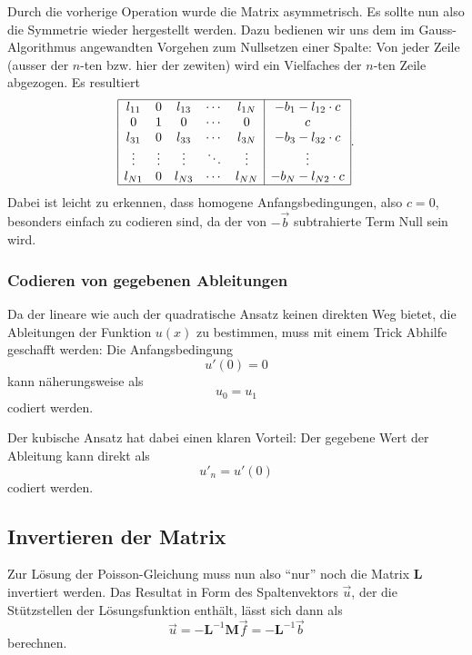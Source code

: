 Durch die vorherige Operation wurde die Matrix asymmetrisch. 
Es sollte nun also die Symmetrie wieder hergestellt werden.
Dazu bedienen wir uns dem im Gauss-Algorithmus angewandten Vorgehen zum Nullsetzen einer Spalte: Von jeder Zeile (ausser der $n$-ten bzw. hier der zewiten) wird ein Vielfaches der $n$-ten Zeile abgezogen.
Es resultiert
\begin{equation*}
        \begin{array}{|ccccc|c|}
            \hline
            l_{11} & 0      & l_{13} & \cdots & l_{1N} & -b_1 - l_{12} \cdot c \\
            0      & 1      & 0      & \cdots & 0      & c                     \\
            l_{31} & 0      & l_{33} & \cdots & l_{3N} & -b_3 - l_{32} \cdot c \\
            \vdots & \vdots & \vdots & \ddots & \vdots & \vdots                \\
            l_{N1} & 0      & l_{N3} & \cdots & l_{NN} & -b_N - l_{N2} \cdot c \\
            \hline
        \end{array}.
\end{equation*}
Dabei ist leicht zu erkennen, dass homogene Anfangsbedingungen, also $c=0$, besonders einfach zu codieren sind, da der von $-\vec{b}$ subtrahierte Term Null sein wird.

\subsubsection{Codieren von gegebenen Ableitungen}
Da der lineare wie auch der quadratische Ansatz keinen direkten Weg bietet, die Ableitungen der Funktion $u(x)$ zu bestimmen, muss mit einem Trick Abhilfe geschafft werden: 
Die Anfangsbedingung
\begin{equation*}
    u'(0) = 0
\end{equation*}
kann näherungsweise als 
\begin{equation*}
    u_0 = u_1
\end{equation*}
codiert werden. 

Der kubische Ansatz hat dabei einen klaren Vorteil: 
Der gegebene Wert der Ableitung kann direkt als 
\begin{equation*}
    u'_n = u'(0)
\end{equation*}
codiert werden.


\subsection{Invertieren der Matrix\label{fem:1d:matrix_invertieren}}
Zur Lösung der Poisson-Gleichung muss nun also ``nur'' noch die Matrix $\mathbf{L}$ invertiert werden.
Das Resultat in Form des Spaltenvektors $\vec{u}$, der die Stützstellen der Lösungsfunktion enthält, lässt sich dann als
\begin{equation*}
    \vec{u} = - \mathbf{L}^{-1}\mathbf{M}\vec{f} = - \mathbf{L}^{-1}\vec{b}
\end{equation*}
berechnen.


